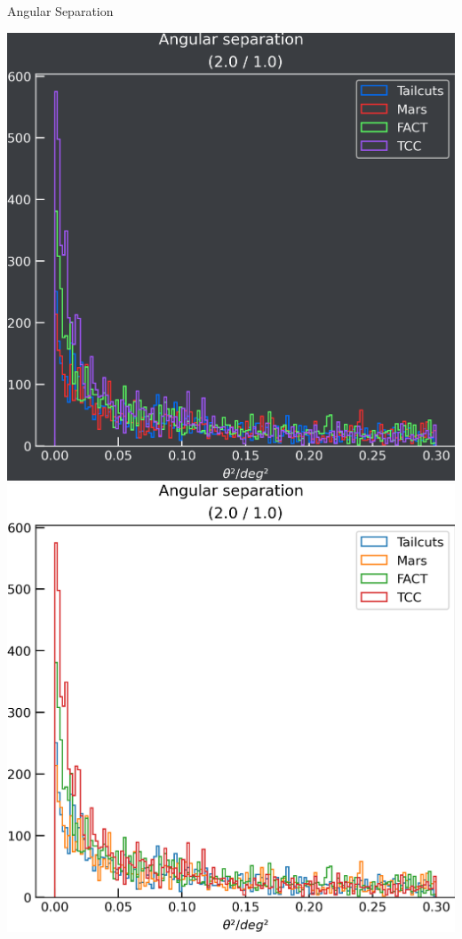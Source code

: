 \begin{frame}{Angular Separation}
  \begin{minipage}{0.32\textwidth}
    \ifdefined\darktheme
      \centering
      \includegraphics[width=\textwidth]{plots/ang_sep/ang_sep__2.0_1.0_dark.png}
    \else
      \centering
      \includegraphics[width=\textwidth]{plots/ang_sep/ang_sep__2.0_1.0_light.png}

\end{minipage}
\end{frame}
